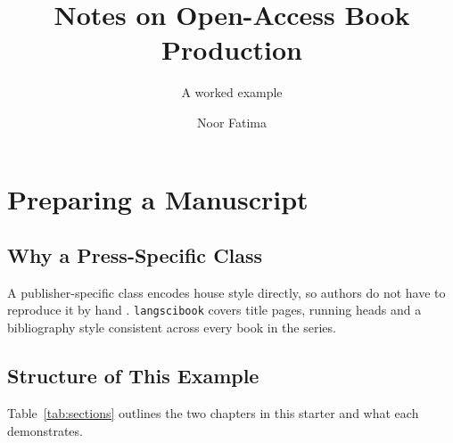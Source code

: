 \documentclass[output=book,minimal,biblatexbackend=bibtex]{langscibook}
\title{Notes on Open-Access Book Production}
\subtitle{A worked example}
\author{Noor Fatima}
\begin{document}
\makeatletter
\renewcommand{\maketitle}{%
  \begingroup
  \centering
  \vspace*{3cm}
  {\LARGE\bfseries \@title\par}
  \vspace{0.5cm}
  {\large \@subtitle\par}
  \vspace{1.5cm}
  {\large \@author\par}
  \endgroup
  \clearpage
}
\makeatother
\maketitle
\frontmatter
\tableofcontents

\mainmatter

\chapter{Preparing a Manuscript}

\section{Why a Press-Specific Class}

A publisher-specific class encodes house style directly, so authors do not
have to reproduce it by hand \citep{knuth1984texbook}. \texttt{langscibook}
covers title pages, running heads and a bibliography style consistent across
every book in the series.

\section{Structure of This Example}

Table~\ref{tab:sections} outlines the two chapters in this starter and what
each demonstrates.
\end{document}
